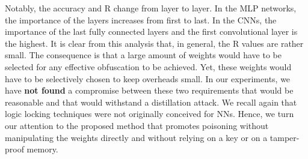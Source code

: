 \documentclass[10pt, twocolumn, conference]{IEEEtran}
\begin{document}
Notably, the accuracy and R change from layer to layer. In the MLP networks, the importance of the layers increases from first to last. In the CNNs, the importance of the last fully connected layers and the first convolutional layer is the highest. It is clear from this analysis that, in general, the R values are rather small. The consequence is that a large amount of weights would have to be selected for any effective obfuscation to be achieved. Yet, these weights would have to be selectively chosen to keep overheads small. In our experiments, we have \textbf{not found} a compromise between these two requirements that would be reasonable and that would withstand a distillation attack. We recall again that logic locking techniques were not originally conceived for NNs. Hence, we turn our attention to the proposed method that promotes poisoning without manipulating the weights directly and without relying on a key or on a tamper-proof memory. 

\end{document}
